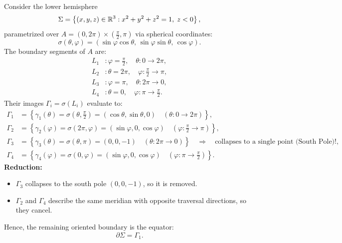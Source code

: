 \begin{exemple}
Consider the lower hemisphere
\begin{equation*}
    \Sigma = \left\{ (x,y,z) \in \mathbb{R}^3 : x^2 + y^2 + z^2 = 1, \; z < 0 \right\},
\end{equation*}
parametrized over $A = (0, 2\pi) \times \left(\frac{\pi}{2}, \pi\right)$ via spherical coordinates:
\begin{equation*}
    \sigma(\theta, \varphi) = (\sin\varphi \cos\theta, \, \sin\varphi \sin\theta, \, \cos\varphi).
\end{equation*}
The boundary segments of $A$ are:
\begin{align*}
    L_1 &\colon \varphi = \tfrac{\pi}{2}, \quad \theta \colon 0 \to 2\pi, \\
    L_2 &\colon \theta = 2\pi, \quad \varphi \colon \tfrac{\pi}{2} \to \pi, \\
    L_3 &\colon \varphi = \pi, \quad \theta \colon 2\pi \to 0, \\
    L_4 &\colon \theta = 0, \quad \varphi \colon \pi \to \tfrac{\pi}{2}.
\end{align*}
Their images $\Gamma_i = \sigma(L_i)$ evaluate to:
\begin{align*}
    \Gamma_1 &= \left\{ \gamma_1(\theta) = \sigma\left(\theta, \tfrac{\pi}{2}\right) = (\cos\theta, \sin\theta, 0) \quad (\theta \colon 0 \to 2\pi) \right\}, \\
    \Gamma_2 &= \left\{ \gamma_2(\varphi) = \sigma(2\pi, \varphi) = (\sin\varphi, 0, \cos\varphi) \quad \left(\varphi \colon \tfrac{\pi}{2} \to \pi\right) \right\}, \\
    \Gamma_3 &= \left\{ \gamma_3(\theta) = \sigma(\theta, \pi) = (0, 0, -1) \quad (\theta \colon 2\pi \to 0) \right\} \quad \Longrightarrow \quad \text{collapses to a single point (South Pole)!}, \\
    \Gamma_4 &= \left\{ \gamma_4(\varphi) = \sigma(0, \varphi) = (\sin\varphi, 0, \cos\varphi) \quad \left(\varphi \colon \pi \to \tfrac{\pi}{2}\right) \right\}.
\end{align*}
\textbf{Reduction:}
\begin{itemize}
    \item $\Gamma_3$ collapses to the south pole $(0,0,-1)$, so it is removed.
    \item $\Gamma_2$ and $\Gamma_4$ describe the same meridian with opposite traversal directions, so they cancel.
\end{itemize}
Hence, the remaining oriented boundary is the equator:
\begin{equation*}
    \partial \Sigma = \Gamma_1.
\end{equation*}
\end{exemple}

